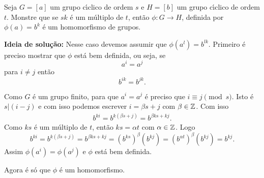 \documentclass[12pt]{exam}
\begin{document}
Seja $G = [a]$ um grupo c{\'\i}clico de ordem $s$ e $H = [b]$ um grupo c{\'\i}clico de ordem $t$. Monstre que se $sk$ \'e um m\'ultiplo de $t$, então $\phi : G \to H$, definida por $\phi(a) = b^k$ \'e um homomorfismo de grupos.

\textbf{Ideia de solução:} Nesse caso devemos assumir que $\phi(a^l) = b^{lk}$. Primeiro é preciso mostrar que $\phi$ está bem definida, ou seja, se
\[
    a^i = a^j
\]
para $i \ne j$ então
\[
    b^{ik} = b^{jk}.
\]

Como $G$ é um grupo finito, para que $a^i = a^j$ é preciso que $i \equiv j \pmod s$. Isto é $s | (i - j)$ e com isso podemos escrever $i = \beta s + j$ com $\beta \in \mathbb{Z}$. Com isso
\begin{align*}
    b^{ki} = b^{k(\beta s + j)} = b^{\beta ks + kj}.
\end{align*}
Como $ks$ é um múltiplo de $t$, então $ks = \alpha t$ com $\alpha \in \mathbb{Z}$. Logo
\[
    b^{ki} = b^{k(\beta s + j)} = b^{\beta ks + kj} = (b^{ks})^\beta(b^{kj}) = (b^{\alpha t})^\beta(b^{kj}) = b^{kj}.
\]
Assim $\phi(a^i) = \phi(a^j)$ e $\phi$ está bem definida.

Agora é só que $\phi$ é um homomorfismo.
\end{document}
